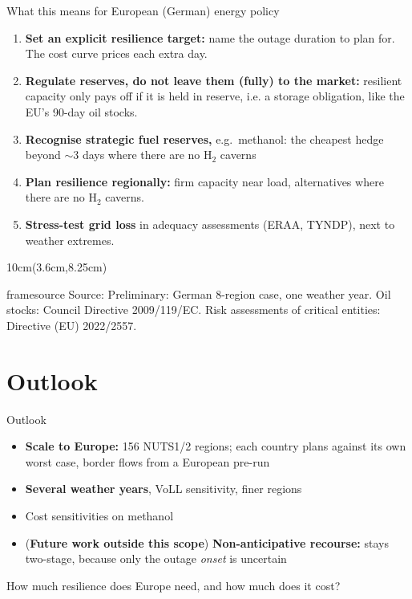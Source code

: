 \documentclass[10pt,aspectratio=169,dvipsnames]{beamer}
\newcommand{\source}[1]{\begin{textblock*}{10cm}(3.6cm,8.25cm)
    \begin{beamercolorbox}[ht=0.5cm,right]{framesource}
        \usebeamerfont{framesource}\usebeamercolor[fg]{framesource} Source: {#1}
    \end{beamercolorbox}
\end{textblock*}}
\newcommand{\takeaway}[1]{%
  \par\smallskip
  \colorbox{panel}{\parbox{\dimexpr\linewidth-2\fboxsep}{\footnotesize\strut#1\strut}}}
\begin{document}
 {
  \begin{frame}{What this means for European (German) energy policy}
	  \begin{enumerate}\setlength{\itemsep}{0.7em}
		  \item \textbf{Set an explicit resilience target:} name the outage duration to plan for.
		        The cost curve prices each extra day.
		  \item \textbf{Regulate reserves, do not leave them (fully) to the market:} resilient capacity only
		        pays off if it is held in reserve, i.e. a storage obligation, like the EU's 90-day oil
		        stocks.
		  \item \textbf{Recognise strategic fuel reserves,} e.g.\ methanol: the cheapest hedge beyond
		        ${\sim}$3 days where there are no H$_2$ caverns
		  \item \textbf{Plan resilience regionally:} firm capacity near load, alternatives where
		        there are no H$_2$ caverns.
		  \item \textbf{Stress-test grid loss} in adequacy assessments (ERAA, TYNDP), next to
		        weather extremes.
	  \end{enumerate}
	  \source{Preliminary: German 8-region case, one weather year. Oil stocks: Council Directive
		  2009/119/EC. Risk assessments of critical entities: Directive (EU) 2022/2557.}
  \end{frame}}

\section{Outlook}
 {
  \begin{frame}{Outlook}
	  \begin{itemize}\setlength{\itemsep}{0.8em}
		  \item \textbf{Scale to Europe:} 156 NUTS1/2 regions; each country plans against its own
		        worst case, border flows from a European pre-run
		  \item \textbf{Several weather years}, VoLL sensitivity, finer regions
		  \item Cost sensitivities on methanol
		  \item (\textbf{Future work outside this scope}) \textbf{Non-anticipative recourse:} stays two-stage, because only the outage \emph{onset} is uncertain
	  \end{itemize}
	  \vspace{1em}
	  \takeaway{\centering How much resilience does Europe need, and how much does it cost?}
  \end{frame}}
\end{document}
